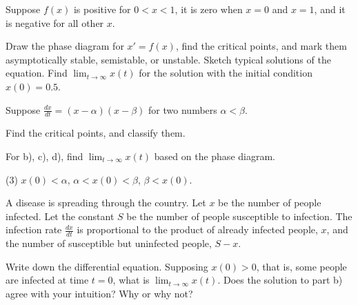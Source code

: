 \documentclass{ximera}
\begin{document}
\begin{exercise}
    Suppose $f(x)$ is positive for $0 < x < 1$, it is zero when $x=0$ and $x=1$, and it is negative for all other $x$.
    \begin{tasks}
        \task Draw the phase diagram for $x' = f(x)$, find the critical points, and mark them asymptotically stable, semistable, or unstable.
        \task Sketch typical solutions of the equation.
        \task Find $\displaystyle \lim_{t\to \infty} x(t)$ for the solution with the initial condition $x(0) = 0.5$.
    \end{tasks}
\end{exercise}

\begin{exercise}
    Suppose $\frac{dx}{dt} = (x-\alpha)(x-\beta)$ for two numbers $\alpha < \beta$.
    \begin{tasks}
        \task Find the critical points, and classify them.
    \end{tasks}
    For b), c), d), find $\displaystyle \lim_{t\to\infty} x(t)$ based on the phase diagram.
    \begin{tasks}[resume](3)
        \task $x(0) < \alpha$,
        \task $\alpha < x(0) < \beta$,
        \task $\beta < x(0)$.
    \end{tasks}
\end{exercise}


\begin{exercise}
    A disease is spreading through the country.  Let $x$ be the number of people infected.  Let the constant $S$ be the number of people susceptible to infection.  The infection rate $\frac{dx}{dt}$ is proportional to the product of already infected people, $x$, and the number of susceptible but uninfected people, $S-x$.
    \begin{tasks}
        \task Write down the differential equation.
        \task Supposing $x(0) > 0$, that is, some people are infected at time $t=0$, what is $\displaystyle \lim_{t\to\infty} x(t)$.
        \task Does the solution to part b) agree with your intuition?  Why or why not?
    \end{tasks}
\end{exercise}


\end{document}
